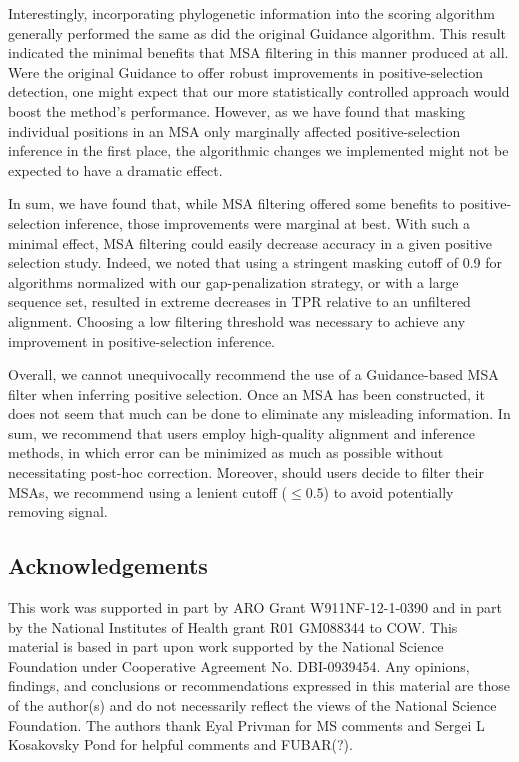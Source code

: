 \documentclass[11pt]{article}
\begin{document}
Interestingly, incorporating phylogenetic information into the scoring algorithm generally performed the same as did the original Guidance algorithm. This result indicated the minimal benefits that MSA filtering in this manner produced at all. Were the original Guidance to offer robust improvements in positive-selection detection, one might expect that our more statistically controlled approach would boost the method's performance. However, as we have found that masking individual positions in an MSA only marginally affected positive-selection inference in the first place, the algorithmic changes we implemented might not be expected to have a dramatic effect.

In sum, we have found that, while MSA filtering offered some benefits to positive-selection inference, those improvements were marginal at best. With such a minimal effect, MSA filtering could easily decrease accuracy in a given positive selection study. Indeed, we noted that using a stringent masking cutoff of 0.9 for algorithms normalized with our gap-penalization strategy, or with a large sequence set, resulted in extreme decreases in TPR relative to an unfiltered alignment. Choosing a low filtering threshold was necessary to achieve any improvement in positive-selection inference.  

Overall, we cannot unequivocally recommend the use of a Guidance-based MSA filter when inferring positive selection. Once an MSA has been constructed, it does not seem that much can be done to eliminate any misleading information. In sum, we recommend that users employ high-quality alignment and inference methods, in which error can be minimized as much as possible without necessitating post-hoc correction. Moreover, should users decide to filter their MSAs, we recommend using a lenient cutoff ($\leq0.5$) to avoid potentially removing signal.


\subsection*{Acknowledgements}
This work was supported in part by ARO Grant W911NF-12-1-0390 and in part by the National Institutes of Health grant R01 GM088344 to COW. This material is based in part upon work supported by the National Science Foundation under Cooperative Agreement No. DBI-0939454. Any opinions, findings, and conclusions or recommendations expressed in this material are those of the author(s) and do not necessarily reflect the views of the National Science Foundation. The authors thank Eyal Privman for MS comments and Sergei L Kosakovsky Pond for helpful comments and FUBAR(?).
\end{document}
